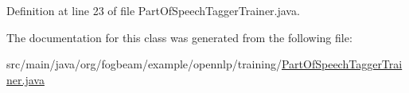 Definition at line 23 of file Part\+Of\+Speech\+Tagger\+Trainer.\+java.



The documentation for this class was generated from the following file\+:\begin{DoxyCompactItemize}
\item 
src/main/java/org/fogbeam/example/opennlp/training/\hyperlink{_part_of_speech_tagger_trainer_8java}{Part\+Of\+Speech\+Tagger\+Trainer.\+java}\end{DoxyCompactItemize}
